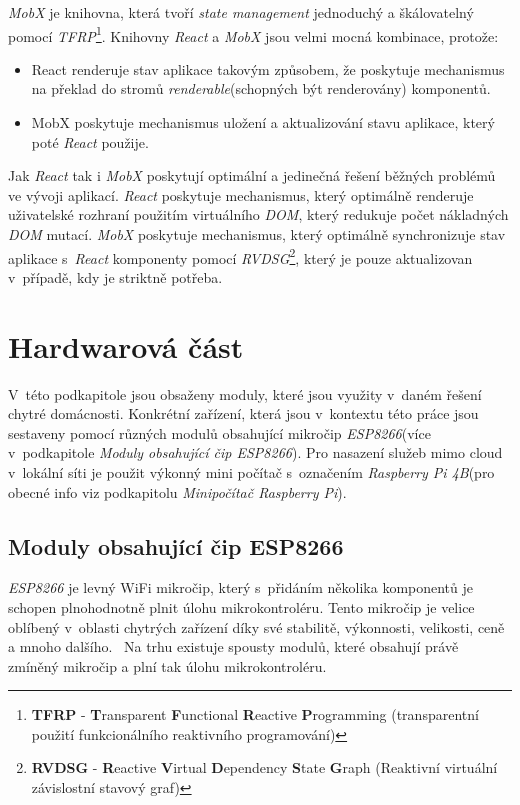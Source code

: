 \emph{MobX} je knihovna, která tvoří \emph{state management} jednoduchý a škálovatelný pomocí \emph{TFRP}\footnote{\textbf{TFRP} - \textbf{T}ransparent \textbf{F}unctional \textbf{R}eactive \textbf{P}rogramming (transparentní použití funkcionálního reaktivního programování)}.
Knihovny \emph{React} a \emph{MobX} jsou velmi mocná kombinace, protože:
\begin{itemize}
  \item React renderuje stav aplikace takovým způsobem, že poskytuje mechanismus na překlad do stromů \emph{renderable}(schopných být renderovány) komponentů.
  \item MobX poskytuje mechanismus uložení a aktualizování stavu aplikace, který poté \emph{React} použije.
\end{itemize}

Jak \emph{React} tak i \emph{MobX} poskytují optimální a jedinečná řešení běžných problémů ve vývoji aplikací.
\emph{React} poskytuje mechanismus, který optimálně renderuje uživatelské rozhraní použitím virtuálního \emph{DOM}, který redukuje počet nákladných \emph{DOM} mutací.
\emph{MobX} poskytuje mechanismus, který optimálně synchronizuje stav aplikace s~\emph{React} komponenty pomocí
\emph{RVDSG}\footnote{\textbf{RVDSG} - \textbf{R}eactive \textbf{V}irtual \textbf{D}ependency \textbf{S}tate \textbf{G}raph (Reaktivní virtuální závislostní stavový graf)}, který je pouze aktualizovan v~případě, kdy je striktně potřeba.~\cite{mobx:info}

\newpage
\section{Hardwarová část}
\label{pouzite:hw}
V~této podkapitole jsou obsaženy moduly, které jsou využity v~daném řešení chytré domácnosti.
Konkrétní zařízení, která jsou v~kontextu této práce jsou sestaveny pomocí různých modulů obsahující mikročip \emph{ESP8266}(více v~podkapitole \emph{Moduly obsahující čip ESP8266}).
Pro nasazení služeb mimo cloud v~lokální síti je použit výkonný mini počítač s~označením \emph{Raspberry Pi 4B}(pro obecné info viz podkapitolu \emph{Minipočítač Raspberry Pi}).

\subsection*{Moduly obsahující čip ESP8266}
\label{terminy:esp8266}

\emph{ESP8266} je levný WiFi mikročip, který s~přidáním několika komponentů je schopen plnohodnotně plnit úlohu mikrokontroléru.
Tento mikročip je velice oblíbený v~oblasti chytrých zařízení díky své stabilitě, výkonnosti, velikosti, ceně a mnoho dalšího.~\cite{wiki:esp}
Na trhu existuje spousty modulů, které obsahují právě zmíněný mikročip a plní tak úlohu mikrokontroléru.

